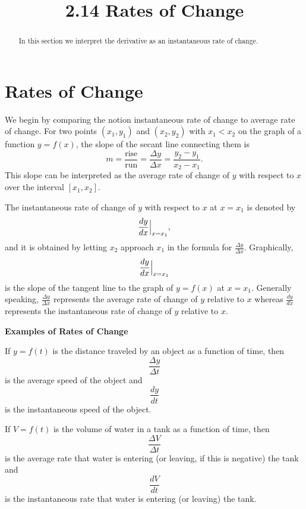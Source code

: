 \documentclass{ximera}
\title{2.14 Rates of Change}
\begin{document}
\begin{abstract}
In this section we interpret the derivative as an instantaneous rate of change.
\end{abstract}

\maketitle

\section{Rates of Change}

We begin by comparing the notion instantaneous rate of change to average rate of change. 
For two points $(x_1, y_1)$ and $(x_2, y_2)$ with $x_1 < x_2$ on the graph of a function
$y = f(x)$, the slope of the secant line connecting them is 
\[m = \frac{\text{rise}}{\text{run}} = \frac{\Delta y}{\Delta x} = \frac{y_2 - y_1}{x_2 - x_1}.\]
This slope can be interpreted as the average rate of change of $y$ with respect to $x$ over the interval $[x_1, x_2]$.

The instantaneous rate of change of $y$ with respect to $x$ at $x = x_1$ is denoted by
\[\frac{dy}{dx}\Big{|}_{x=x_1},\]
and it is obtained by letting $x_2$ approach $x_1$ in the formula for $\frac{\Delta y}{\Delta x}.$
Graphically, 
\[\frac{dy}{dx}\Big{|}_{x=x_1}\]
is the slope of the tangent line to the graph of $y = f(x)$ at $x=x_1$.
Generally speaking, $\frac{\Delta y}{\Delta x}$
represents the average rate of change of $y$ relative to $x$ whereas
$\frac{dy}{dx}$
represents the instantaneous rate of change of $y$ relative to $x$.


\begin{center}
\bf{Examples of Rates of Change}
\end{center}
 
\begin{example}[example 1]

If $y = f(t)$ is the distance traveled by an object as a function of time, then 
\[\frac{\Delta y}{\Delta t}\]
is the average speed of the object and
\[\frac{dy}{dt}\]
is the instantaneous speed of the object.
\end{example}

\begin{example} If $V = f(t)$ is the volume of water in a tank as a function of time, then 
\[\frac{\Delta V}{\Delta t}\]
is the average rate that water is entering (or leaving, if this is negative) the tank and
\[\frac{dV}{dt}\]
is the instantaneous rate that water is entering (or leaving) the tank.
 \end{example}
\end{document}
